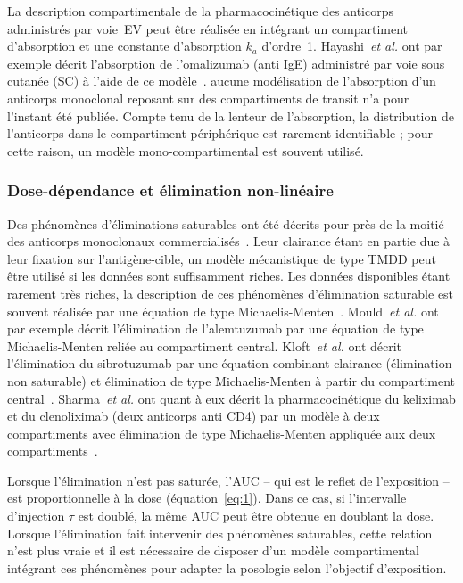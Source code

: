 La description compartimentale de la pharmacocinétique des anticorps administrés par voie~\gls{EV} peut être réalisée en intégrant un compartiment d'absorption et une constante d'absorption $k_{a}$ d'ordre~1. Hayashi~\textit{et al.} ont par exemple décrit l'absorption de l'omalizumab (anti IgE) administré par voie sous cutanée (SC) à l'aide de ce modèle~\citep{REF61}. aucune modélisation de l'absorption d'un anticorps monoclonal reposant sur des compartiments de transit n'a pour l'instant été publiée. Compte tenu de la lenteur de l'absorption, la distribution de l'anticorps dans le compartiment périphérique est rarement identifiable ; pour cette raison, un modèle mono-compartimental est souvent utilisé.

\subsubsection{Dose-dépendance et élimination non-linéaire}
Des phénomènes d'éliminations saturables ont été décrits pour près de la moitié des anticorps monoclonaux commercialisés~\citep{REF62}. Leur clairance étant en partie due à leur fixation sur l'antigène-cible, un modèle mécanistique de type TMDD peut être utilisé si les données sont suffisamment riches. Les données disponibles étant rarement très riches, la description de ces phénomènes d'élimination saturable est souvent réalisée par une équation de type Michaelis-Menten~\citep{REF3}. Mould~\textit{et al.} ont par exemple décrit l'élimination de l'alemtuzumab par une équation de type Michaelis-Menten reliée au compartiment central. Kloft~\textit{et al.} ont décrit l'élimination du sibrotuzumab par une équation combinant clairance (élimination non saturable) et élimination de type Michaelis-Menten à partir du compartiment central~\citep{REF63}. Sharma~\textit{et al.} ont quant à eux décrit la pharmacocinétique du keliximab et du clenoliximab (deux anticorps anti CD4)  par un modèle à deux compartiments avec élimination de type Michaelis-Menten appliquée aux deux compartiments~\citep{REF64}.

Lorsque l'élimination n'est pas saturée, l'\gls{AUC} -- qui est le reflet de l'exposition -- est proportionnelle à la dose (équation~\ref{eq:1}). Dans ce cas, si l'intervalle d'injection $\tau$ est doublé, la même \gls{AUC} peut être obtenue en doublant la dose. Lorsque l'élimination fait intervenir des phénomènes saturables, cette relation n'est plus vraie et il est nécessaire de disposer d'un modèle compartimental intégrant ces phénomènes pour adapter la posologie selon l'objectif d'exposition.

